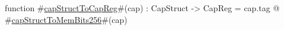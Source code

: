 function #\hyperref[zcapStructToCapReg]{capStructToCapReg}#(cap) : CapStruct -> CapReg = cap.tag @ #\hyperref[zcapStructToMemBitstwofivesix]{capStructToMemBits256}#(cap)
